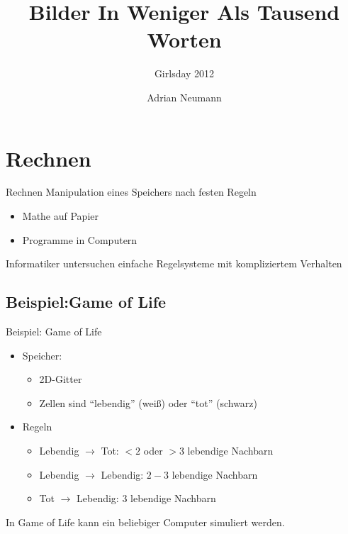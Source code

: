 \documentclass{beamer}
\title{Bilder In Weniger Als Tausend Worten}
\subtitle{Girlsday 2012}
\institute{Universit\"at des Saarlandes}
\date{}
\author[A. Neumann]{
	Adrian Neumann
}
\theoremstyle{example}
\begin{document}
\lstset{basicstyle=\ttfamily\footnotesize, numbers=left, numberstyle=\tiny, language=cf}
\frame{\titlepage}

\section{Rechnen}
\begin{frame}{Rechnen}
Manipulation eines Speichers nach festen Regeln
\begin{itemize}
\item Mathe auf Papier
\item Programme in Computern
\end{itemize}
\begin{block}{}\centering
Informatiker untersuchen einfache Regelsysteme mit kompliziertem Verhalten
\end{block}
\end{frame}

\subsection{Beispiel:Game of Life}
\begin{frame}{Beispiel: Game of Life}
\begin{itemize}
\item Speicher: 
  \begin{itemize}
    \item 2D-Gitter
    \item Zellen sind ``lebendig'' (weiß) oder ``tot'' (schwarz)
  \end{itemize}
\item Regeln
  \begin{itemize}
  \item Lebendig $\rightarrow$ Tot: $<2$ oder $>3$ lebendige Nachbarn
  \item Lebendig $\rightarrow$ Lebendig: $2-3$ lebendige Nachbarn
  \item Tot $\rightarrow$ Lebendig: 3 lebendige Nachbarn
  \end{itemize}
\end{itemize}
\begin{block}{}\centering
\centering In Game of Life kann ein beliebiger Computer simuliert werden.
\end{block}
\end{frame}
\end{document}
